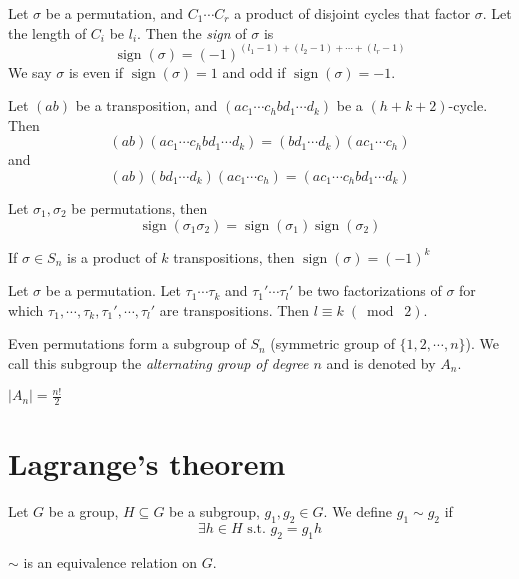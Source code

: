 \begin{definition}
Let $\sigma$ be a permutation, and $C_1\cdots C_r$ a product of disjoint cycles that factor $\sigma$. Let the length of $C_i$ be $l_i$. Then the \textit{sign}  of $\sigma$ is 
$$
\operatorname{sign}(\sigma) = (-1)^{(l_1-1)+(l_2-1)+\cdots +(l_r-1)}
$$
We say $\sigma$ is even if $\operatorname{sign}(\sigma)=1$ and odd if $\operatorname{sign}(\sigma)=-1$.
\end{definition}

\begin{lemma}
Let $(ab)$ be a transposition, and $(a c_1\cdots c_h b d_1\cdots d_k)$ be a $(h+k+2)$-cycle. Then
$$
(ab)(a c_1\cdots c_h b d_1\cdots d_k) = (b d_1\cdots d_k)(a c_1\cdots c_h)
$$
and 
$$
(ab)(b d_1\cdots d_k)(a c_1\cdots c_h) = (a c_1\cdots c_h b d_1\cdots d_k)
$$
\end{lemma}

\begin{prop}
Let $\sigma_1, \sigma_2$ be permutations, then 
$$
\operatorname{sign}(\sigma_1\sigma_2) = \operatorname{sign}(\sigma_1)\operatorname{sign}(\sigma_2)
$$
\end{prop}

\begin{corollary}
If $\sigma \in S_n$ is a product of $k$ transpositions, then $\operatorname{sign}(\sigma) = (-1)^{k}$
\end{corollary}



\begin{prop}
Let $\sigma$ be a permutation. Let $\tau_1\cdots \tau_k$ and $\tau_1'\cdots \tau_l'$ be two factorizations of $\sigma$ for which $\tau_1,\cdots ,\tau_k,\tau_1',\cdots ,\tau_l'$ are transpositions. Then $l \equiv k \;(\bmod\; 2)$.
\end{prop}

\begin{corollary}
Even permutations form a subgroup of $S_n$ (symmetric group of $\{ 1,2,\cdots ,n \}$). We call this subgroup the \textit{alternating group of degree $n$} and is denoted by $A_n$.
\end{corollary}

\begin{remark}
$|A_n| = \frac{n!}{2}$
\end{remark}

\newpage

\section{Lagrange's theorem} \label{sec:}
Let $G$ be a group, $H \subseteq G$ be a subgroup, $g_1,g_2 \in G$. We define $g_1 \sim  g_2$ if
$$
\exists h \in H \text{ s.t. } g_2 = g_1h
$$
\begin{remark}
$\sim $ is an equivalence relation on $G$.
\end{remark}

